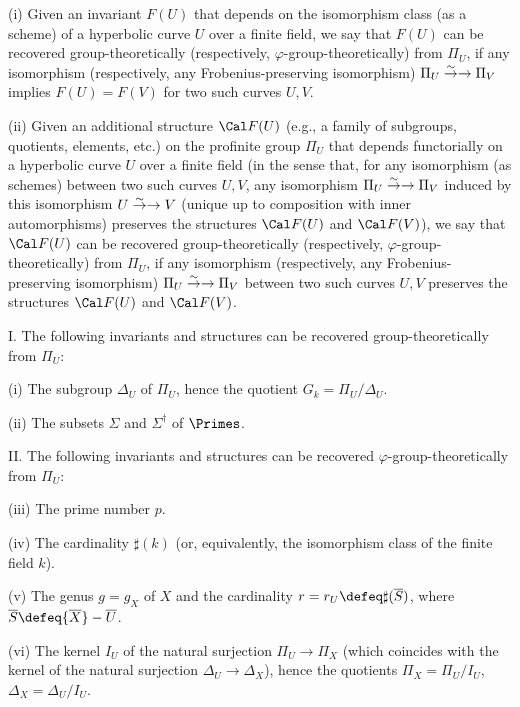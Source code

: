 (i) Given an invariant $F(U)$ that depends on the isomorphism class 
(as a scheme) of a hyperbolic curve $U$ over a finite field, we say 
that $F(U)$ can be recovered group-theoretically (respectively, 
$\varphi$-group-theoretically) from $\Pi_U$, 
if any isomorphism (respectively, any Frobenius-preserving isomorphism) 
$\Pi_U\overset \sim \to \rightarrow \Pi_V$ %
implies $F(U)=F(V)$ for two such curves $U,V$. 

\noindent
(ii) Given an additional structure ${\Cal F}(U)$ (e.g., 
a family of subgroups, quotients, elements, etc.) 
on the profinite group $\Pi_U$ that depends 
functorially on a hyperbolic curve $U$ over a finite field 
(in the sense that, for any isomorphism (as schemes) 
between two such curves $U,V$, 
any isomorphism $\Pi_U\overset \sim \to \rightarrow\Pi_V$ 
induced by this isomorphism 
$U\overset \sim \to \rightarrow V$ (unique up to composition with inner automorphisms) 
preserves the structures ${\Cal F}(U)$ and ${\Cal F}(V)$), 
we say that ${\Cal F}(U)$ can be recovered group-theoretically 
(respectively, $\varphi$-group-theoretically) from $\Pi_U$, 
if any isomorphism (respectively, any Frobenius-preserving isomorphism) 
$\Pi_U\overset \sim \to \rightarrow\Pi_V$ %
between two such curves 
$U,V$ preserves the structures ${\Cal F}(U)$ and ${\Cal F}(V)$. 
\enddefinition

{\rm I.} 
The following invariants and structures can be 
recovered group-theoretically from $\Pi_U$: 

\noindent
{\rm (i)} The subgroup $\Delta_U$ of $\Pi_U$, hence 
the quotient $G_k=\Pi_U/\Delta_U$. 

\noindent
{\rm (ii)} The subsets $\Sigma$ and $\Sigma^\dag$ of $\Primes$. 
\noindent

\smallskip\noindent
{\rm II.} 
The following invariants and structures can be 
recovered $\varphi$-group-theoretically from $\Pi_U$: 

\noindent
{\rm (iii)} The prime number $p$. 

\noindent
{\rm (iv)} The cardinality $\sharp(k)$ 
(or, equivalently, the isomorphism class of the finite field $k$). 

\noindent
{\rm (v)} The genus $g=g_X$ of $X$ and the cardinality $r=r_U\defeq
\sharp({\overline S})$, where ${\overline S}\defeq{\overline X}-{\overline U}$. 

\noindent
{\rm (vi)} The kernel $I_U$ of the natural surjection $\Pi_U\to\Pi_X$ 
(which coincides with the kernel of the natural surjection 
$\Delta_U\to\Delta_{X}$), hence the quotients 
$\Pi_X=\Pi_U/I_U$, $\Delta_{X}=\Delta_U/I_U$. 

